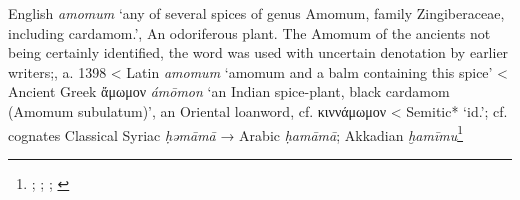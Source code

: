 \begin{etymology}\label{ety:amomum}
English \textit{amomum} `any of several spices of genus Amomum, family Zingiberaceae, including cardamom.', An odoriferous plant. The Amomum of the ancients not being certainly identified, the word was used with uncertain denotation by earlier writers;, a. 1398
< Latin \textit{amomum} `amomum and a balm containing this spice'
< Ancient Greek {ἄμωμον} \textit{ámōmon} `an Indian spice-plant, black cardamom (Amomum subulatum)', an Oriental loanword, cf. κιννάμωμον
< Semitic* `id.'; cf. cognates Classical Syriac  \textit{ḥəmāmā} → Arabic  \textit{ḥamāmā}; Akkadian \textit{ḫamīmu}\footnote{\textcite[amomum]{oed}; \textcite{lewis_latin_1879}; \textcites[]{liddell_greek-english_1940}[97]{beekes_etymological_2010}; \textcites[169]{low_aramaeische_1881}[100]{lev_practical_2008}[vol. 6, p. 66]{roth_assyrian_2004}}
\end{etymology}